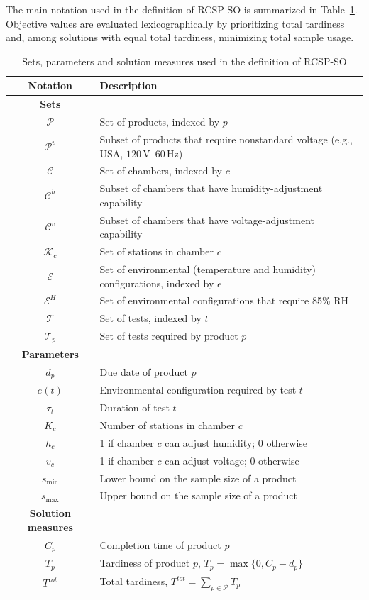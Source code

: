 The main notation used in the definition of RCSP-SO is summarized in
Table~\ref{tab:notation_RCSP-SO}.
Objective values are evaluated lexicographically by prioritizing total
tardiness and, among solutions with equal total tardiness, minimizing
total sample usage.

\begin{table}[H]
\caption{Sets, parameters and solution measures used in the definition of RCSP-SO}
\label{tab:notation_RCSP-SO}
\centering
\small
\begin{tabular}{cl}
\toprule
\textbf{Notation} & \textbf{Description}\\
\midrule
\textbf{Sets} & \\
\midrule
\(\mathcal{P}\) & Set of products, indexed by \(p\) \\
\(\mathcal{P}^v\) & Subset of products that require nonstandard voltage (e.g., USA, \(120\,\mathrm{V}\)--\(60\,\mathrm{Hz}\)) \\
\(\mathcal{C}\) & Set of chambers, indexed by \(c\) \\
\(\mathcal{C}^h\) & Subset of chambers that have humidity-adjustment capability \\
\(\mathcal{C}^v\) & Subset of chambers that have voltage-adjustment capability \\
\(\mathcal{K}_c\) & Set of stations in chamber \(c\) \\
\(\mathcal{E}\) & Set of environmental (temperature and humidity) configurations, indexed by \(e\) \\
\(\mathcal{E}^H\) & Set of environmental configurations that require 85\% RH \\
\(\mathcal{T}\) & Set of tests, indexed by \(t\) \\
\(\mathcal{T}_p\) & Set of tests required by product \(p\) \\
\midrule
\textbf{Parameters} & \\
\midrule
\(d_p\) & Due date of product \(p\) \\
\(e(t)\) & Environmental configuration required by test \(t\) \\
\(\tau_t\) & Duration of test \(t\) \\
\(K_c\) & Number of stations in chamber \(c\) \\
\(h_c\) & 1 if chamber \(c\) can adjust humidity; 0 otherwise \\
\(v_c\) & 1 if chamber \(c\) can adjust voltage; 0 otherwise \\
\(s_{\min}\) & Lower bound on the sample size of a product \\
\(s_{\max}\) & Upper bound on the sample size of a product \\
\midrule
\textbf{Solution measures} & \\
\midrule
\(C_p\) & Completion time of product \(p\) \\
\(T_p\) & Tardiness of product \(p\), \(T_p=\max\{0,C_p-d_p\}\) \\
\(T^{tot}\) & Total tardiness, \(T^{tot}=\sum_{p\in\mathcal{P}}T_p\) \\
\bottomrule
\end{tabular}
\end{table}

